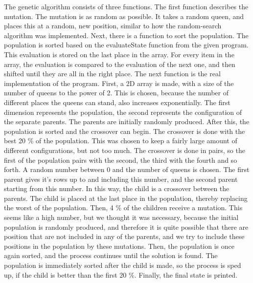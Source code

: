 \documentclass{article}
\begin{document}
	The genetic algorithm consists of three functions. The first function describes the mutation. The mutation is as random as possible. It takes a random queen, and places this at a random, new position, similar to how the random-search algorithm was implemented. Next, there is a function to sort the population. The population is sorted based on the evaluateState function from the given program. This evaluation is stored on the last place in the array. For every item in the array, the evaluation is compared to the evaluation of the next one, and then shifted until they are all in the right place. The next function is the real implementation of the program. First, a 2D array is made, with a size of the number of queens to the power of 2. This is chosen, because the number of different places the queens can stand, also increases exponentially. The first dimension represents the population, the second represents the configuration of the separate parents. The parents are initially randomly produced. After this, the population is sorted and the crossover can begin. The crossover is done with the best 20 \% of the population. This was chosen to keep a fairly large amount of different configurations, but not too much. The crossover is done in pairs, so the first of the population pairs with the second, the third with the fourth and so forth. A random number between 0 and the number of queens is chosen. The first parent gives it's rows up to and including this number, and the second parent starting from this number. In this way, the child is a crossover between the parents. The child is placed at the last place in the population, thereby replacing the worst of the population. Then, 4 \% of the children receive a mutation. This seems like a high number, but we thought it was necessary, because the initial population is randomly produced, and therefore it is quite possible that there are position that are not included in any of the parents, and we try to include these positions in the population by these mutations. Then, the population is once again sorted, and the process continues until the solution is found. The population is immediately sorted after the child is made, so the process is sped up, if the child is better than the first 20 \%. Finally, the final state is printed.
	
\end{document}
